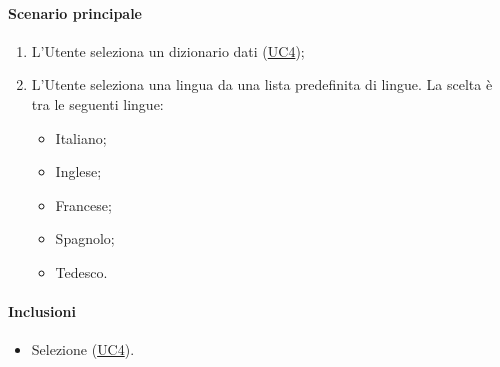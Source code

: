 \paragraph*{Scenario principale}
\begin{enumerate}
  \item L'Utente seleziona un dizionario dati (\hyperref[UC4]{UC4});
  \item L'Utente seleziona una lingua da una lista predefinita di lingue. La scelta è tra le seguenti lingue:
    \begin{itemize}
      \item Italiano;
      \item Inglese;
      \item Francese;
      \item Spagnolo;
      \item Tedesco.
    \end{itemize}
\end{enumerate}

\paragraph*{Inclusioni}
\begin{itemize}
  \item Selezione  (\hyperref[UC4]{UC4}).
\end{itemize}

